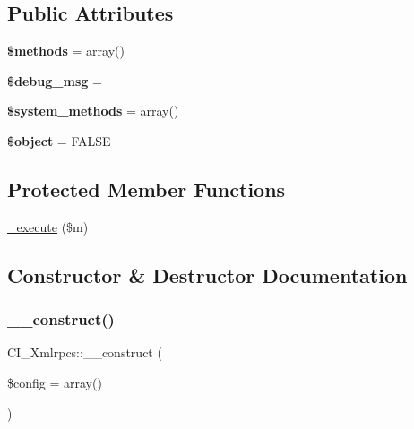 \subsection*{Public Attributes}
\begin{DoxyCompactItemize}
\item 
\mbox{\label{class_c_i___xmlrpcs_a3ca24939c1a4b399f444ac3ee49ed018}} 
{\bfseries \$methods} = array()
\item 
\mbox{\label{class_c_i___xmlrpcs_a6e8673a7617766bec99faff4c5d76665}} 
{\bfseries \$debug\+\_\+msg} = \textquotesingle{}\textquotesingle{}
\item 
\mbox{\label{class_c_i___xmlrpcs_a69d0cf28135203d91906f1c0b377fedf}} 
{\bfseries \$system\+\_\+methods} = array()
\item 
\mbox{\label{class_c_i___xmlrpcs_ad45b78924a5b5955c4e45d34c460a188}} 
{\bfseries \$object} = F\+A\+L\+SE
\end{DoxyCompactItemize}
\subsection*{Protected Member Functions}
\begin{DoxyCompactItemize}
\item 
\mbox{\hyperlink{class_c_i___xmlrpcs_a4b0481451d0e70aa1c8e033890e514c9}{\+\_\+execute}} (\$m)
\end{DoxyCompactItemize}


\subsection{Constructor \& Destructor Documentation}
\mbox{\label{class_c_i___xmlrpcs_a664d04143396d4ff91c27a3d7c405471}} 
\subsubsection{\texorpdfstring{\+\_\+\+\_\+construct()}{\_\_construct()}}
{\footnotesize\ttfamily C\+I\+\_\+\+Xmlrpcs\+::\+\_\+\+\_\+construct (\begin{DoxyParamCaption}\item[{}]{\$config = {\ttfamily array()} }\end{DoxyParamCaption})}

